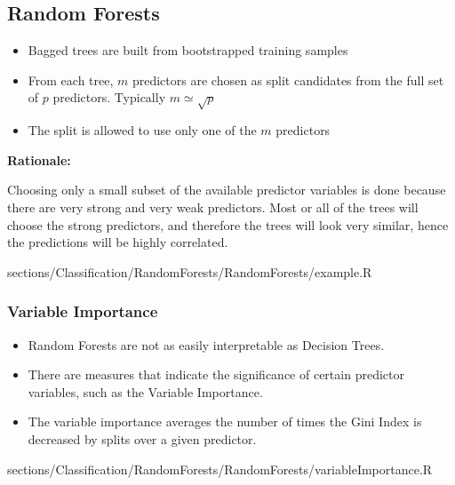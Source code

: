 \subsection{Random Forests}
	\RTheory
	{
		\begin{itemize}
	    	\item Bagged trees are built from bootstrapped training samples
	    	\item From each tree, $m$ predictors are chosen as split candidates from the full set of $p$ predictors. Typically $m \simeq \sqrt{p}$
	    	\item The split is allowed to use only one of the $m$ predictors
		\end{itemize}
		
		\textbf{Rationale:}
		
		Choosing only a small subset of the available predictor variables is done because there are very strong and very weak predictors. Most or all of the trees will choose the strong predictors, and therefore the trees will look very similar, hence the predictions will be highly correlated.
	}
	{
		sections/Classification/RandomForests/RandomForests/example.R
	}
	
	\subsubsection{Variable Importance}
		\RTheory
		{
			\begin{itemize}
			    \item Random Forests are not as easily interpretable as Decision Trees.
			    \item There are measures that indicate the significance of certain predictor variables, such as the Variable Importance.
			    \item The variable importance averages the number of times the Gini Index is decreased by splits over a given predictor.
			\end{itemize}
		}
		{
			sections/Classification/RandomForests/RandomForests/variableImportance.R
		}
		